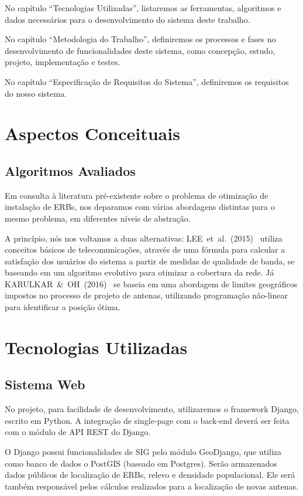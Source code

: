 \documentclass[]{politex}
\begin{document}
No capítulo ``Tecnologias Utilizadas'', listaremos as ferramentas, algoritmos
e dados necessários para o desenvolvimento do sistema deste trabalho.

No capítulo ``Metodologia do Trabalho'', definiremos os processos e fases
no desenvolvimento de funcionalidades deste sistema, como concepção, estudo,
projeto, implementação e testes.

No capítulo ``Especificação de Requisitos do Sistema'', definiremos os
requisitos do nosso sistema.


\chapter{Aspectos Conceituais}

\section{Algoritmos Avaliados}
Em consulta à literatura pré-existente sobre o problema de otimização de
instalação de ERBs, nos deparamos com várias abordagens distintas para o mesmo
problema, em diferentes níveis de abstração.

A princípio, nós nos voltamos a duas alternativas: LEE~et~al.~(2015)~
\cite{evolutivo} utiliza conceitos básicos de telecomunicações, através de uma
fórmula para calcular a satisfação dos usuários do sistema a partir de medidas
de qualidade de banda, se baseando em um algoritmo evolutivo para otimizar
a cobertura da rede. Já KARULKAR~\&~OH~(2016)~\cite{nao-linear} se baseia em
uma abordagem de limites geográficos impostos no processo de projeto de antenas,
utilizando programação não-linear para identificar a posição ótima.


\chapter{Tecnologias Utilizadas}

\section{Sistema Web}
No projeto, para facilidade de desenvolvimento, utilizaremos o framework Django,
escrito em Python. A integração de single-page com o back-end deverá ser feita
com o módulo de API REST do Django.

O Django possui funcionalidades de SIG pelo módulo GeoDjango, que utiliza como
banco de dados o PostGIS (baseado em Postgres). Serão armazenados
dados públicos de localização de ERBs, relevo e densidade populacional. Ele
será também responsável pelos cálculos realizados para a localização de novas
antenas.
\end{document}
